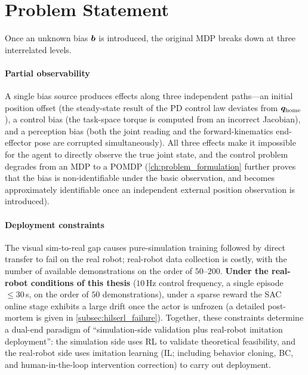 \section{Problem Statement}\label{sec:problem_statement}

Once an unknown bias $\bm{b}$ is introduced, the original MDP breaks down at three interrelated levels.

\paragraph{Partial observability} A single bias source produces effects along three independent paths---an initial position offset (the steady-state result of the PD control law deviates from $\bm{q}_{\text{home}}$), a control bias (the task-space torque is computed from an incorrect Jacobian), and a perception bias (both the joint reading and the forward-kinematics end-effector pose are corrupted simultaneously). All three effects make it impossible for the agent to directly observe the true joint state, and the control problem degrades from an MDP to a POMDP (\cref{ch:problem_formulation} further proves that the bias is non-identifiable under the basic observation, and becomes approximately identifiable once an independent external position observation is introduced).

\paragraph{Deployment constraints} The visual sim-to-real gap causes pure-simulation training followed by direct transfer to fail on the real robot; real-robot data collection is costly, with the number of available demonstrations on the order of $50$--$200$. \textbf{Under the real-robot conditions of this thesis} ($10$\,Hz control frequency, a single episode $\le 30$\,s, on the order of $50$ demonstrations), under a sparse reward the SAC online stage exhibits a large drift once the actor is unfrozen (a detailed post-mortem is given in \cref{subsec:hilserl_failure}). Together, these constraints determine a dual-end paradigm of ``simulation-side validation plus real-robot imitation deployment'': the simulation side uses RL to validate theoretical feasibility, and the real-robot side uses imitation learning (IL; including behavior cloning, BC, and human-in-the-loop intervention correction) to carry out deployment.

